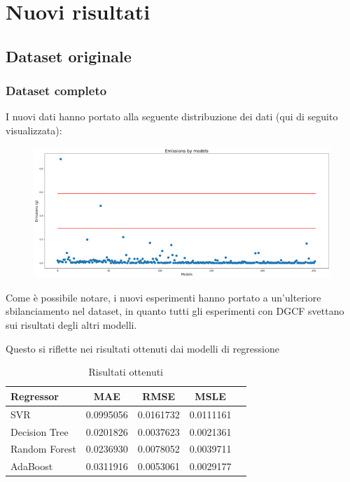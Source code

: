 \section{Nuovi risultati}

\subsection{Dataset originale}

\subsubsection{Dataset completo}

I nuovi dati hanno portato alla seguente distribuzione dei dati (qui di seguito visualizzata):
\begin{figure}[H]
    \centering
    \includegraphics[scale=1.25]{images/nuova-situazione.png}
\end{figure}

Come è possibile notare, i nuovi esperimenti hanno portato a un'ulteriore sbilanciamento nel dataset, in quanto tutti gli esperimenti con DGCF svettano sui risultati degli altri modelli.

Questo si riflette nei risultati ottenuti dai modelli di regressione

\begin{table}[H]
    \centering
    \begin{tabular}{|>{\centering\arraybackslash}m{5cm}|c|c|c|c|}
        \hline
        \textbf{Regressor} & \textbf{MAE} & \textbf{RMSE} & \textbf{MSLE} \\ [10pt]
        \hline
        SVR & 0.0995056 & 0.0161732 & 0.0111161 \\ [10pt]
        \hline
        Decision Tree & 0.0201826 & 0.0037623 & 0.0021361 \\ [10pt]
        \hline
        Random Forest & 0.0236930 & 0.0078052 & 0.0039711 \\ [10pt]
        \hline
        AdaBoost & 0.0311916 & 0.0053061 & 0.0029177 \\ [10pt]
        \hline
    \end{tabular}
    \caption*{Risultati ottenuti}
    \label{tab:results}
\end{table}

